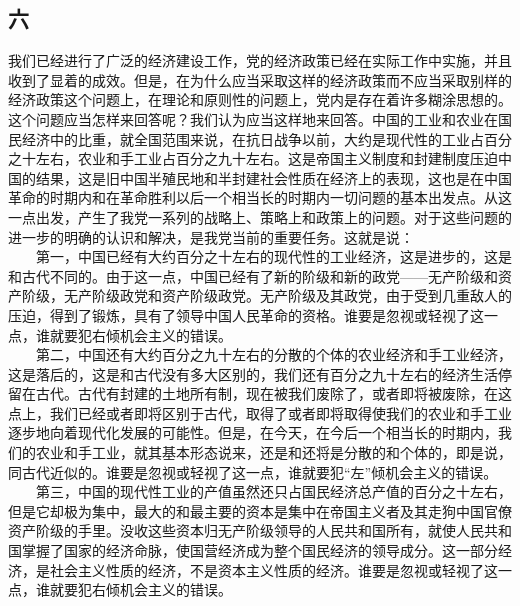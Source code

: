 \documentclass[cn,11pt,chinese]{elegantbook}
\def\myformat#1{\hfil\hfil #1}
\begin{document}
\subsection*{\myformat{六 }}
我们已经进行了广泛的经济建设工作，党的经济政策已经在实际工作中实施，并且收到了显着的成效。但是，在为什么应当采取这样的经济政策而不应当采取别样的经济政策这个问题上，在理论和原则性的问题上，党内是存在着许多糊涂思想的。这个问题应当怎样来回答呢？我们认为应当这样地来回答。中国的工业和农业在国民经济中的比重，就全国范围来说，在抗日战争以前，大约是现代性的工业占百分之十左右，农业和手工业占百分之九十左右。这是帝国主义制度和封建制度压迫中国的结果，这是旧中国半殖民地和半封建社会性质在经济上的表现，这也是在中国革命的时期内和在革命胜利以后一个相当长的时期内一切问题的基本出发点。从这一点出发，产生了我党一系列的战略上、策略上和政策上的问题。对于这些问题的进一步的明确的认识和解决，是我党当前的重要任务。这就是说：\\
　　第一，中国已经有大约百分之十左右的现代性的工业经济，这是进步的，这是和古代不同的。由于这一点，中国已经有了新的阶级和新的政党——无产阶级和资产阶级，无产阶级政党和资产阶级政党。无产阶级及其政党，由于受到几重敌人的压迫，得到了锻炼，具有了领导中国人民革命的资格。谁要是忽视或轻视了这一点，谁就要犯右倾机会主义的错误。\\
　　第二，中国还有大约百分之九十左右的分散的个体的农业经济和手工业经济，这是落后的，这是和古代没有多大区别的，我们还有百分之九十左右的经济生活停留在古代。古代有封建的土地所有制，现在被我们废除了，或者即将被废除，在这点上，我们已经或者即将区别于古代，取得了或者即将取得使我们的农业和手工业逐步地向着现代化发展的可能性。但是，在今天，在今后一个相当长的时期内，我们的农业和手工业，就其基本形态说来，还是和还将是分散的和个体的，即是说，同古代近似的。谁要是忽视或轻视了这一点，谁就要犯“左”倾机会主义的错误。\\
　　第三，中国的现代性工业的产值虽然还只占国民经济总产值的百分之十左右，但是它却极为集中，最大的和最主要的资本是集中在帝国主义者及其走狗中国官僚资产阶级的手里。没收这些资本归无产阶级领导的人民共和国所有，就使人民共和国掌握了国家的经济命脉，使国营经济成为整个国民经济的领导成分。这一部分经济，是社会主义性质的经济，不是资本主义性质的经济。谁要是忽视或轻视了这一点，谁就要犯右倾机会主义的错误。\\
\end{document}
